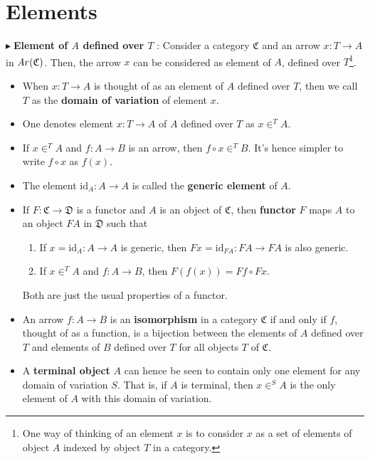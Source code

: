 \documentclass{article}
\theoremstyle{definition}
\theoremstyle{remark}
\theoremstyle{definition}
\theoremstyle{definition}
\theoremstyle{definition}
\newcommand{\cat}[1]{\mathfrak{#1}}
\newcommand{\arr}[1]{\text{\textit{Ar}}(#1)}
\newcommand{\Id}[1]{\text{id}_{#1}}
\newcommand{\point}[0]{$\blacktriangleright\;$}
\newcommand{\elem}[1]{\in ^{#1}}
\begin{document}
\section{Elements}
\point \textbf{Element of $ A $ defined over $ T $} : Consider a category $ \cat{C} $ and an arrow $ x : T \to A $ in $ \arr{\cat{C}} $. Then, the arrow $ x $ can be considered as element of $ A $, defined over $ T $\footnote{One way of thinking of an element $ x $ is to consider $ x $ as a set of elements of object $ A $ indexed by object $ T $ in a category.}. 
\begin{itemize}
	\item {When $ x:T\to A $ is thought of as an element of $ A $ defined over $ T $, then we call $ T $ as the \textbf{domain of variation} of element $ x $.}
	\item {One denotes element $ x:T\to A $ of $ A $ defined over $ T $ as $ x\elem{T}A $.}
	\item {If $ x\elem{T} A $ and $ f : A\to B $ is an arrow, then $ f\circ x \elem{T} B $. It's hence simpler to write $ f\circ x $ as $ f(x) $.}
	\item {The element $ \Id{A} : A\to A $ is called the \textbf{generic element} of $ A $.}
	\item {If $ F : \cat{C} \to \cat{D}$ is a functor and $ A $ is an object of $ \cat{C} $, then \textbf{functor} $ F $ maps $ A $ to an object $ FA $ in $ \cat{D} $ such that 
\begin{enumerate}
	\item {If $ x = \Id{A} : A\to A $ is generic, then $ Fx = \Id{FA} : FA \to FA$ is also generic.}
	\item {If $ x\elem{T}A $ and $ f : A\to B $, then $ F(f(x)) = Ff\circ Fx$.}
\end{enumerate}	
Both are just the usual properties of a functor.
}
\item {An arrow $ f : A\to B $ is an \textbf{isomorphism} in a category $ \cat{C} $ if and only if $ f $, thought of as a function, is a bijection between the elements of $ A $ defined over $ T $ and elements of $ B $ defined over $ T $ for all objects $ T $ of $ \cat{C} $.}
\item {A \textbf{terminal object} $ A $ can hence be seen to contain only one element for any domain of variation $ S $. That is, if $ A $ is terminal, then $ x\elem{S}A $ is the only element of $ A $ with this domain of variation.}
\end{itemize}
\end{document}

